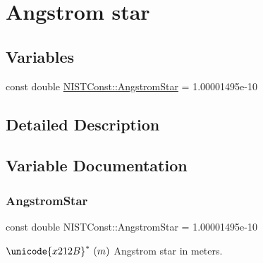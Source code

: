 \hypertarget{group___n_i_s_t_const-_angstrom_star}{}\section{Angstrom star}
\label{group___n_i_s_t_const-_angstrom_star}
\subsection*{Variables}
\begin{DoxyCompactItemize}
\item 
const double \hyperlink{group___n_i_s_t_const-_angstrom_star_ga42db9558ed1ddd9706c14e4d0b0863cc}{N\+I\+S\+T\+Const\+::\+Angstrom\+Star} = 1.\+00001495e-\/10
\end{DoxyCompactItemize}


\subsection{Detailed Description}


\subsection{Variable Documentation}
\mbox{\label{group___n_i_s_t_const-_angstrom_star_ga42db9558ed1ddd9706c14e4d0b0863cc}} 
\subsubsection{\texorpdfstring{Angstrom\+Star}{AngstromStar}}
{\footnotesize\ttfamily const double N\+I\+S\+T\+Const\+::\+Angstrom\+Star = 1.\+00001495e-\/10}

$\unicode{x212B}^{\ast} \ (m)$ Angstrom star in meters. 